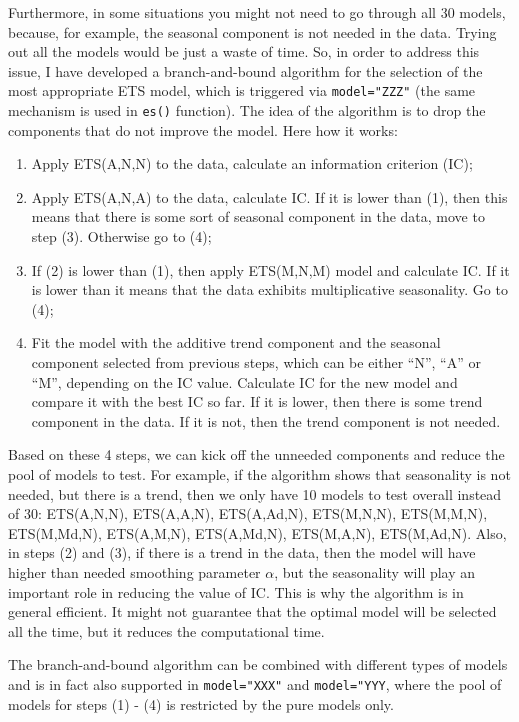 \documentclass[
]{book}
\providecommand{\tightlist}{%
  \setlength{\itemsep}{0pt}\setlength{\parskip}{0pt}}
\theoremstyle{definition}
\theoremstyle{definition}
\theoremstyle{definition}
\theoremstyle{definition}
\theoremstyle{remark}
\begin{document}
Furthermore, in some situations you might not need to go through all 30 models, because, for example, the seasonal component is not needed in the data. Trying out all the models would be just a waste of time. So, in order to address this issue, I have developed a branch-and-bound algorithm for the selection of the most appropriate ETS model, which is triggered via \texttt{model="ZZZ"} (the same mechanism is used in \texttt{es()} function). The idea of the algorithm is to drop the components that do not improve the model. Here how it works:

\begin{enumerate}
\def\labelenumi{\arabic{enumi}.}
\tightlist
\item
  Apply ETS(A,N,N) to the data, calculate an information criterion (IC);
\item
  Apply ETS(A,N,A) to the data, calculate IC. If it is lower than (1), then this means that there is some sort of seasonal component in the data, move to step (3). Otherwise go to (4);
\item
  If (2) is lower than (1), then apply ETS(M,N,M) model and calculate IC. If it is lower than it means that the data exhibits multiplicative seasonality. Go to (4);
\item
  Fit the model with the additive trend component and the seasonal component selected from previous steps, which can be either ``N'', ``A'' or ``M'', depending on the IC value. Calculate IC for the new model and compare it with the best IC so far. If it is lower, then there is some trend component in the data. If it is not, then the trend component is not needed.
\end{enumerate}

Based on these 4 steps, we can kick off the unneeded components and reduce the pool of models to test. For example, if the algorithm shows that seasonality is not needed, but there is a trend, then we only have 10 models to test overall instead of 30: ETS(A,N,N), ETS(A,A,N), ETS(A,Ad,N), ETS(M,N,N), ETS(M,M,N), ETS(M,Md,N), ETS(A,M,N), ETS(A,Md,N), ETS(M,A,N), ETS(M,Ad,N). Also, in steps (2) and (3), if there is a trend in the data, then the model will have higher than needed smoothing parameter \(\alpha\), but the seasonality will play an important role in reducing the value of IC. This is why the algorithm is in general efficient. It might not guarantee that the optimal model will be selected all the time, but it reduces the computational time.

The branch-and-bound algorithm can be combined with different types of models and is in fact also supported in \texttt{model="XXX"} and \texttt{model="YYY}, where the pool of models for steps (1) - (4) is restricted by the pure models only.
\end{document}

